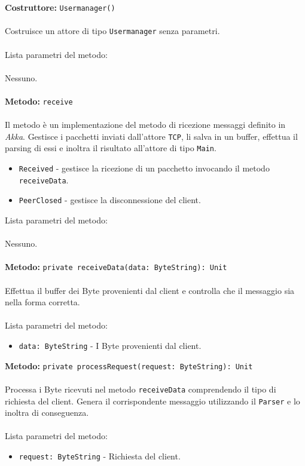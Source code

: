 \documentclass[a4paper]{article}
\begin{document}
		\textbf{Costruttore: }\texttt{Usermanager()}
			\\ \\
			Costruisce un attore di tipo \texttt{Usermanager} senza parametri.
			\\ \\
			Lista parametri del metodo:
			\\ \\
			Nessuno.
			\\ \\
		\textbf{Metodo: }\texttt{receive}
			\\ \\
			Il metodo è un implementazione del metodo di ricezione messaggi definito in \emph{Akka}. Gestisce i pacchetti inviati dall'attore \texttt{TCP}, li salva in un buffer, effettua il parsing di essi e inoltra il risultato all'attore di tipo \texttt{Main}.
			\begin{itemize}
				\item \texttt{Received} - gestisce la ricezione di un pacchetto invocando il metodo \texttt{receiveData}.
				\item \texttt{PeerClosed} - gestisce la disconnessione del client.
			\end{itemize}
			Lista parametri del metodo:
			\\ \\
			Nessuno.
			\\ \\
		\textbf{Metodo: }\texttt{private receiveData(data: ByteString): Unit}
			\\ \\
			Effettua il  buffer dei Byte provenienti dal client e controlla che il messaggio sia nella forma corretta.
			\\ \\
			Lista parametri del metodo:
			\begin{itemize}
				\item \texttt{data: ByteString} - I Byte provenienti dal client.
			\end{itemize}
		\textbf{Metodo: }\texttt{private processRequest(request: ByteString): Unit}
			\\ \\
			Processa i Byte ricevuti nel metodo \texttt{receiveData} comprendendo il tipo di richiesta del client. Genera il corrispondente messaggio utilizzando il \texttt{Parser} e lo inoltra di conseguenza.
			\\ \\
			Lista parametri del metodo:
			\begin{itemize}
				\item \texttt{request: ByteString} - Richiesta del client.
			\end{itemize}
\end{document}
